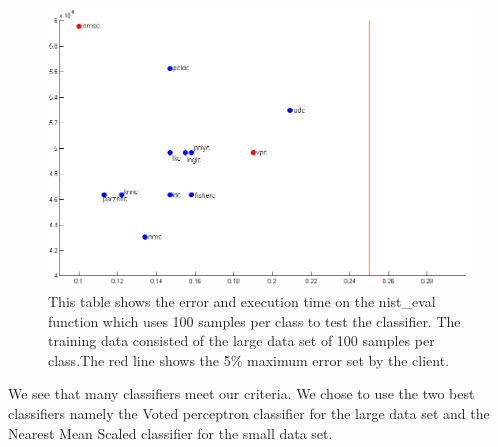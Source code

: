 \documentclass[%
        compressed,
        final,
        notitlepage,
        narroweqnarray,
        inline,
        twoside,
        ]{ieee}
\begin{document}
\begin{figure}[]
    \includegraphics[scale=0.385]{images/small_data_set_tested.png}

    \caption{
        This table shows the error and execution time on the nist\_eval
    function which uses 100 samples per class to test the classifier. The
training data consisted of the large data set of 100 samples per class.The
        red line shows the 5\% maximum error set by the client.  }
    \label{fig:test-small}
\end{figure}
We see that many classifiers meet our criteria. We chose to use the two best
classifiers namely the Voted perceptron classifier for the large data set and
the Nearest Mean Scaled classifier for the small data set.
\end{document}
